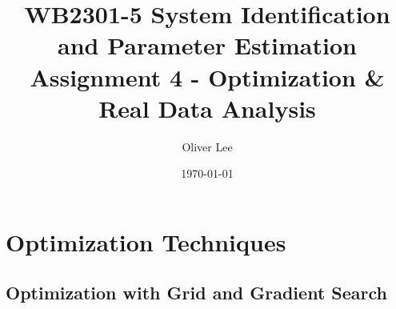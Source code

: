 \documentclass[11pt,a4paper]{article}
\title{WB2301-5 System Identification and Parameter Estimation \\
Assignment 4 - Optimization \& Real Data Analysis}
\author{Oliver Lee}
\date{\today}
\begin{document}
\maketitle

\section{Optimization Techniques}

\subsection{Optimization with Grid and Gradient Search}

\end{document}
